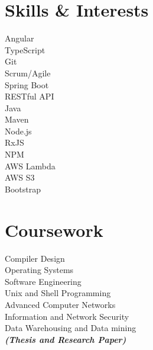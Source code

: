 \documentclass[]{deedy-resume-openfont}
\begin{document}
\begin{minipage}[t]{0.33\textwidth}

\section{Skills \& Interests}
\sectionsep
{}
\textbullet{} Angular \\
\textbullet{}   TypeScript \\
\textbullet{} Git \\
\textbullet{} Scrum/Agile \\
\sectionsep
{}
\textbullet{} Spring Boot \\
\textbullet{} RESTful API \\
\textbullet{} Java \\
\textbullet{} Maven \\
\textbullet{} Node.js \\
\textbullet{} RxJS \\ 
\textbullet{} NPM \\
\textbullet{} AWS Lambda \\
\textbullet{} AWS S3 \\
\textbullet{} Bootstrap \\
\sectionsep


\section{Coursework}
Compiler Design \\
Operating Systems \\
Software Engineering \\
Unix and Shell Programming \\
Advanced Computer Networks \\
Information and Network Security \\
Data Warehousing and Data mining  \\
{\footnotesize \textit{\textbf{(Thesis and Research Paper) }}} \\



%
%

\end{minipage} 
\hfill
\end{document}
